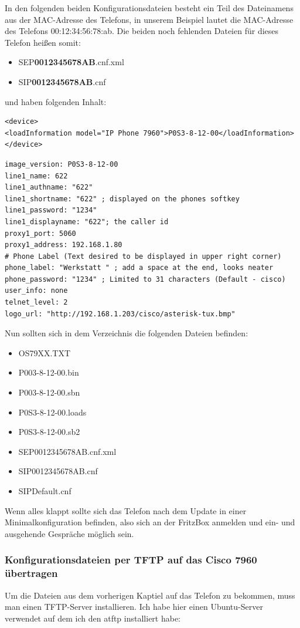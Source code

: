 \documentclass[a4paper,12pt]{scrbook}
\begin{document}
In den folgenden beiden Konfigurationsdateien besteht ein Teil des Dateinamens aus der MAC-Adresse des Telefons, in unserem Beispiel lautet die MAC-Adresse des Telefons 00:12:34:56:78:ab.
Die beiden noch fehlenden Dateien für dieses Telefon heißen somit:
\begin{itemize}
 \item SEP\textbf{0012345678AB}.cnf.xml
 \item SIP\textbf{0012345678AB}.cnf
\end{itemize}
und haben folgenden Inhalt:

\begin{lstlisting}[caption={SEP0012345678AB.cnf.xml},label=lst:7960sep0012345678abcnfxml]
<device>
<loadInformation model="IP Phone 7960">P0S3-8-12-00</loadInformation>
</device>
\end{lstlisting}

\begin{lstlisting}[caption={SIP0012345678AB.cnf},label=lst:7960sip0012345678abcnf]
image_version: P0S3-8-12-00
line1_name: 622
line1_authname: "622"
line1_shortname: "622" ; displayed on the phones softkey
line1_password: "1234"
line1_displayname: "622"; the caller id
proxy1_port: 5060
proxy1_address: 192.168.1.80
# Phone Label (Text desired to be displayed in upper right corner)
phone_label: "Werkstatt " ; add a space at the end, looks neater
phone_password: "1234" ; Limited to 31 characters (Default - cisco)
user_info: none
telnet_level: 2
logo_url: "http://192.168.1.203/cisco/asterisk-tux.bmp"
\end{lstlisting}

Nun sollten sich in dem Verzeichnis die folgenden Dateien befinden:
\begin{itemize}
 \item OS79XX.TXT  
 \item P003-8-12-00.bin  
 \item P003-8-12-00.sbn  
 \item P0S3-8-12-00.loads
 \item P0S3-8-12-00.sb2
 \item SEP0012345678AB.cnf.xml
 \item SIP0012345678AB.cnf
 \item SIPDefault.cnf
\end{itemize}
Wenn alles klappt sollte sich das Telefon nach dem Update in einer Minimalkonfiguration befinden, also sich an der FritzBox anmelden und ein- und ausgehende Gespräche möglich sein.

\subsubsection{Konfigurationsdateien per TFTP auf das Cisco 7960 übertragen}
Um die Dateien aus dem vorherigen Kaptiel auf das Telefon zu bekommen, muss man einen TFTP-Server installieren. 
Ich habe hier einen Ubuntu-Server verwendet auf dem ich den atftp installiert habe:
\end{document}
